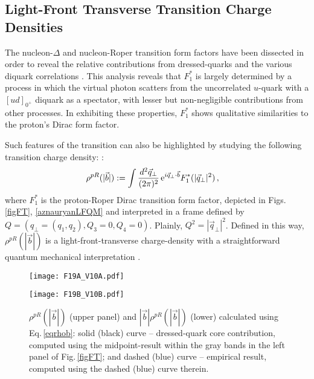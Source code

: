 \subsection{Light-Front Transverse Transition Charge Densities}
%
The nucleon-$\Delta$ and nucleon-Roper transition form factors have been dissected in order to reveal the relative contributions from dressed-quarks and the various diquark correlations \cite{Segovia:2016zyc}.  This analysis reveals that $F_1^\ast$ is largely determined by a process in which the virtual photon scatters from the uncorrelated $u$-quark with a $[ud]_{0^+}$ diquark as a spectator, with lesser but non-negligible contributions from other processes.  In exhibiting these properties, $F_1^\ast$ shows qualitative similarities to the proton's Dirac form factor.

Such features of the transition can also be highlighted by studying the following transition charge density: \cite{Tiator:2008kd}:
\begin{align}
\label{eqrhob}
\rho^{pR}(|\vec{b}|)
& := \int \frac{d^2 \vec{q}_\perp }{(2\pi)^2} \,{\rm e}^{i \vec{q}_\perp \cdot \vec{b}} F_1^\ast(|\vec{q}_\perp|^2)\,,
%
\end{align}
where $F_1^\ast$ is the proton-Roper Dirac transition form factor, depicted in Figs.\,\ref{figFT}, \ref{aznauryanLFQM} and interpreted in a frame defined by $Q=({q}_\perp=(q_1,q_2),Q_3=0,Q_4=0)$.  Plainly, $Q^2 = |\vec{q}_\perp|^2$.  Defined in this way, $\rho^{pR}(|\vec{b}|)$ is a light-front-transverse charge-density with a straightforward quantum mechanical interpretation \cite{Miller:2007uy}.  %

\begin{figure}[t]
\centerline{%
\texttt{[image: F19A\_V10A.pdf]}}
%
\centerline{%
\texttt{[image: F19B\_V10B.pdf]}}
\caption{\label{rhob}
%
$\rho^{pR}(|\vec{b}|)$ (upper panel) and $|\vec{b}| \rho^{pR}(|\vec{b}|) $ (lower) calculated using Eq.\,\eqref{eqrhob}: solid (black) curve -- dressed-quark core contribution, computed using the midpoint-result within the gray bands in the left panel of Fig.\,\ref{figFT}; and dashed (blue) curve -- empirical result, computed using the dashed (blue) curve therein.}
\end{figure}

